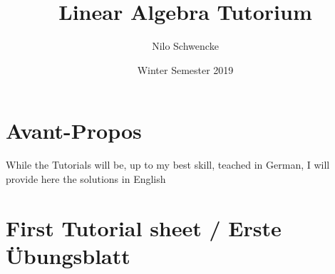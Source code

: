 \documentclass[a4paper,10pt]{article}
\title{Linear Algebra Tutorium}
\author{Nilo Schwencke}
\date{Winter Semester 2019}
\begin{document}
\maketitle

\section{Avant-Propos}

While the Tutorials will be, up to my best skill, teached in German, I will provide here the solutions in English

\section{First Tutorial sheet / Erste \"Ubungsblatt}


\end{document}
